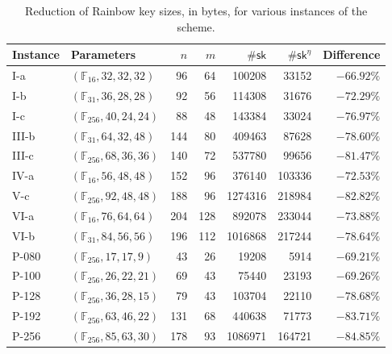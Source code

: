 \documentclass[draft, 12pt, a4paper, oneside]{memoir}
\theoremstyle{definition}
\begin{document}
\begin{table}[htbp]
  \renewcommand{\arraystretch}{1.2}
  \setlength{\tabcolsep}{6.5pt}
  \centering
  \caption{Reduction of Rainbow key sizes, in bytes, for various instances of the scheme.}\label{tab:1}
  \begin{tabular}{*{2}{l}*{5}{r}}
    \toprule
    Instance & Parameters & $n$ & $m$ & $\#\mathsf{sk}$ & $\#\mathsf{sk}^{\eta}$ & Difference \\ \midrule
    I-a    & $(\mathbb{F}_{ 16}, 32, 32, 32)$  &   96 &   64 &   100208 &   33152 & $-66.92\%$ \\
    I-b    & $(\mathbb{F}_{ 31}, 36, 28, 28)$  &   92 &   56 &   114308 &   31676 & $-72.29\%$ \\
    I-c    & $(\mathbb{F}_{256}, 40, 24, 24)$  &   88 &   48 &   143384 &   33024 & $-76.97\%$ \\
    III-b  & $(\mathbb{F}_{ 31}, 64, 32, 48)$  &  144 &   80 &   409463 &   87628 & $-78.60\%$ \\
    III-c  & $(\mathbb{F}_{256}, 68, 36, 36)$  &  140 &   72 &   537780 &   99656 & $-81.47\%$ \\
    IV-a   & $(\mathbb{F}_{ 16}, 56, 48, 48)$  &  152 &   96 &   376140 &  103336 & $-72.53\%$ \\
    V-c    & $(\mathbb{F}_{256}, 92, 48, 48)$  &  188 &   96 &  1274316 &  218984 & $-82.82\%$ \\
    VI-a   & $(\mathbb{F}_{ 16}, 76, 64, 64)$  &  204 &  128 &   892078 &  233044 & $-73.88\%$ \\
    VI-b   & $(\mathbb{F}_{ 31}, 84, 56, 56)$  &  196 &  112 &  1016868 &  217244 & $-78.64\%$ \\
    P-080  & $(\mathbb{F}_{256}, 17, 17,  9)$  &   43 &   26 &    19208 &    5914 & $-69.21\%$ \\
    P-100  & $(\mathbb{F}_{256}, 26, 22, 21)$  &   69 &   43 &    75440 &   23193 & $-69.26\%$ \\
    P-128  & $(\mathbb{F}_{256}, 36, 28, 15)$  &   79 &   43 &   103704 &   22110 & $-78.68\%$ \\
    P-192  & $(\mathbb{F}_{256}, 63, 46, 22)$  &  131 &   68 &   440638 &   71773 & $-83.71\%$ \\
    P-256  & $(\mathbb{F}_{256}, 85, 63, 30)$  &  178 &   93 &  1086971 &  164721 & $-84.85\%$ \\
    \bottomrule
  \end{tabular}
\end{table}
\end{document}
